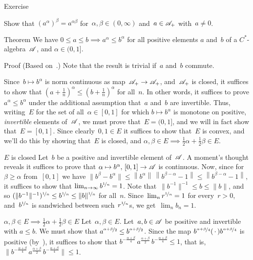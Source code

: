 \documentclass[a]{subfiles}
\begin{document}
\begin{parsec}
\begin{point}{Exercise}
\begin{enumerate}
Show that $(a^\alpha)^\beta = a^{\alpha\beta}$
for~$\alpha,\beta\in (0,\infty)$
and~$a\in\mathscr{A}_+$ with~$a\neq 0$.
\end{enumerate}
\end{point}
\begin{point}{Theorem}%
We have $0\leq a\leq b \implies a^\alpha \leq b^\alpha$
for all positive elements $a$ and~$b$
of a $C^*$-algebra~$\mathscr{A}$,
and $\alpha\in (0,1]$.
\begin{point}{Proof}%
(Based on~\cite{pedersen1972}.)
Note that the result is trivial if~$a$ and~$b$ commute.

Since~$b\mapsto b^\alpha$
is norm continuous as map~$\mathscr{A}_+\to\mathscr{A}_+$,
and~$\mathscr{A}_+$ is closed,
it suffices to show that
$(a+\frac{1}{n})^\alpha \leq (b+\frac{1}{n})^\alpha$
for all~$n$.
In other words,
it suffices to prove $a^\alpha \leq b^\alpha$
under the additional assumption that~$a$ and~$b$ are invertible.
Thus, writing~$E$ for the set of all~$\alpha\in[0,1]$
for which $b\mapsto b^\alpha$ is monotone
on positive,
\emph{invertible} elements of~$\mathscr{A}$,
we must prove that~$E=(0,1]$,
and we will in fact show that~$E=[0,1]$.
Since clearly~$0,1\in E$
it suffices to show that~$E$ is convex,
and we'll do this by showing that~$E$
is closed,
and $\alpha,\beta\in E\implies \frac{1}{2}\alpha 
+ \frac{1}{2}\beta \in E$.

\begin{point}{$E$ is closed}
Let~$b$ be a positive and invertible element of~$\mathscr{A}$.
A moment's thought reveals it suffices to 
prove that $\alpha\mapsto b^\alpha, \,[0,1]\to\mathscr{A}$
is continuous.
Now, since for $\beta\geq \alpha$ from~$[0,1]$
we have $\|b^\beta - b^\alpha\|\leq  
\left\|b^\alpha\right\|\,\left\|b^{\beta-\alpha}-1\right\|
\leq \left\|b^{\beta-\alpha}-1\right\|$,
it suffices to show that $\lim_{n\to\infty} b^{\nicefrac{1}{n}}=1$.
Note that~$\|b^{-1}\|^{-1}\leq b\leq \|b\|$,
and so
$(\|b^{-1}\|^{-1})^{\nicefrac{1}{n}} \leq b^{\nicefrac{1}{n}}\leq 
\|b\|^{\nicefrac{1}{n}}$
for all~$n$.
Since~$\lim_n r^{\nicefrac{1}{n}}=1$ for every~$r>0$,
and~$b^{\nicefrac{1}{n}}$
is sandwiched between such~$r^{\nicefrac{1}{n}}$s,
we get~$\lim_n b_n=1$.
\end{point}
\begin{point}{$\alpha,\beta\in E\implies \frac{1}{2}\alpha+\frac{1}{2}\beta
	\in E$}
Let~$\alpha,\beta\in E$. Let~$a,b\in\mathscr{A}$ be positive
and invertible with $a\leq b$.
We must show that $a^{\nicefrac{\alpha+\beta}{2}}\leq 
b^{\nicefrac{\alpha+\beta}{2}}$.
Since the map $b^{\nicefrac{\alpha+\beta}{4}}(\,\cdot\,)
b^{\nicefrac{\alpha+\beta}{4}}$
is positive (by~),
it suffices to show that
$b^{-\frac{\alpha+\beta}{4}}\,a^{\frac{\alpha+\beta}{2}}\,
b^{-\frac{\alpha+\beta}{4}} \leq 1$,
that is, 
$\|b^{-\frac{\alpha+\beta}{4}}\,a^{\frac{\alpha+\beta}{2}}\,
b^{-\frac{\alpha+\beta}{4}} \| \leq 1$.


\end{point}
\end{point}
\end{point}
\end{parsec}
\end{document}
